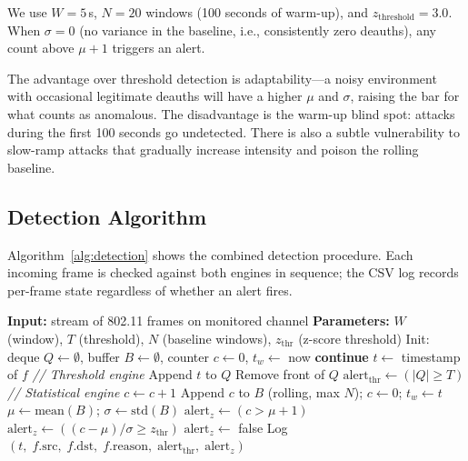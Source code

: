 \documentclass[conference]{IEEEtran}
\begin{document}
We use $W = 5$\,s, $N = 20$ windows (100 seconds of warm-up), and $z_\text{threshold} = 3.0$. When $\sigma = 0$ (no variance in the baseline, i.e., consistently zero deauths), any count above $\mu + 1$ triggers an alert.

The advantage over threshold detection is adaptability---a noisy environment with occasional legitimate deauths will have a higher $\mu$ and $\sigma$, raising the bar for what counts as anomalous. The disadvantage is the warm-up blind spot: attacks during the first 100 seconds go undetected. There is also a subtle vulnerability to slow-ramp attacks that gradually increase intensity and poison the rolling baseline.

\subsection{Detection Algorithm}

Algorithm~\ref{alg:detection} shows the combined detection procedure. Each incoming frame is checked against both engines in sequence; the CSV log records per-frame state regardless of whether an alert fires.

\begin{algorithm}[htbp]
\caption{Combined threshold and statistical detection.}
\label{alg:detection}
\begin{algorithmic}[1]
\STATE \textbf{Input:} stream of 802.11 frames on monitored channel
\STATE \textbf{Parameters:} $W$ (window), $T$ (threshold), $N$ (baseline windows), $z_\text{thr}$ (z-score threshold)
\STATE Init: deque $Q \leftarrow \emptyset$, buffer $B \leftarrow \emptyset$, counter $c \leftarrow 0$, $t_w \leftarrow$ now
        \STATE \textbf{continue}
    \ENDIF
    \STATE $t \leftarrow$ timestamp of $f$
    \STATE \textit{// Threshold engine}
    \STATE Append $t$ to $Q$
        \STATE Remove front of $Q$
    \ENDWHILE
    \STATE $\text{alert}_\text{thr} \leftarrow (|Q| \geq T)$
    \STATE \textit{// Statistical engine}
    \STATE $c \leftarrow c + 1$
        \STATE Append $c$ to $B$ (rolling, max $N$); $c \leftarrow 0$; $t_w \leftarrow t$
    \ENDIF
        \STATE $\mu \leftarrow \text{mean}(B)$; $\sigma \leftarrow \text{std}(B)$
            \STATE $\text{alert}_z \leftarrow (c > \mu + 1)$
        \ELSE
            \STATE $\text{alert}_z \leftarrow ((c - \mu)/\sigma \geq z_\text{thr})$
        \ENDIF
    \ELSE
        \STATE $\text{alert}_z \leftarrow$ false
    \ENDIF
    \STATE Log $(t,\; f.\text{src},\; f.\text{dst},\; f.\text{reason},\; \text{alert}_\text{thr},\; \text{alert}_z)$
\ENDFOR
\end{algorithmic}
\end{algorithm}
\end{document}
